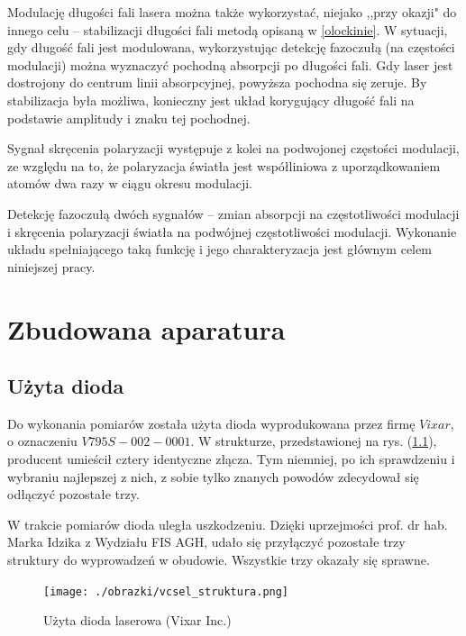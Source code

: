 \documentclass[a4paper,10pt,twoside]{report}
\begin{document}
Modulację długości fali lasera można także wykorzystać, niejako  ,,przy okazji" do innego celu -- stabilizacji długości fali metodą opisaną w \ref{olockinie}. W sytuacji, gdy długość fali jest modulowana, wykorzystując detekcję fazoczułą (na częstości modulacji) można wyznaczyć pochodną absorpcji po długości fali.
Gdy laser jest dostrojony do centrum linii absorpcyjnej, powyższa pochodna się zeruje. By stabilizacja była możliwa, konieczny jest układ korygujący długość fali na podstawie amplitudy i znaku tej pochodnej.

Sygnał skręcenia polaryzacji występuje z kolei na podwojonej częstości modulacji, ze względu na to, że polaryzacja światła jest współliniowa z uporządkowaniem atomów dwa razy w ciągu okresu modulacji.

Detekcję fazoczułą dwóch sygnałów -- zmian absorpcji na częstotliwości modulacji i skręcenia polaryzacji światła na podwójnej częstotliwości modulacji. Wykonanie układu spełniającego taką funkcję i jego charakteryzacja jest głównym celem niniejszej pracy.




\chapter{Zbudowana aparatura}
\label{ch:aparatura}
\section{Użyta dioda}


Do wykonania pomiarów została użyta dioda wyprodukowana przez firmę $Vixar$, o oznaczeniu $V795S-002-0001$.
W strukturze, przedstawionej na rys. (\ref{struktura}), producent umieścił cztery identyczne złącza. Tym niemniej, po ich sprawdzeniu i wybraniu najlepszej z nich, z sobie tylko znanych powodów zdecydował się odłączyć pozostałe trzy.

W trakcie pomiarów dioda uległa uszkodzeniu. Dzięki uprzejmości prof. dr hab. Marka Idzika z Wydziału FIS AGH, udało się przyłączyć pozostałe trzy struktury do wyprowadzeń w obudowie.
Wszystkie trzy okazały się sprawne.

\begin{figure}[h!]
\begin{center}
 \texttt{[image: ./obrazki/vcsel\_struktura.png]}
\end{center}
\caption{Użyta dioda laserowa (Vixar Inc.)}
\label{struktura}
\end{figure}
\end{document}
